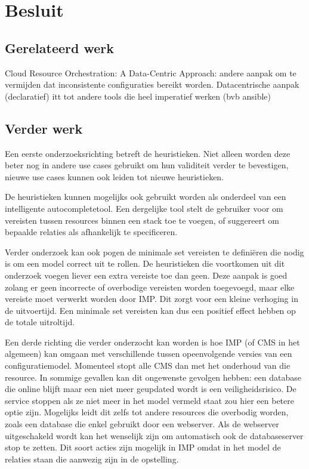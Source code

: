 \chapter{Besluit}
\label{sec:besluit}

\section{Gerelateerd werk}
Cloud Resource Orchestration: A Data-Centric Approach: andere aanpak om te vermijden dat inconsistente configuraties bereikt worden.
Datacentrische aanpak (declaratief) itt tot andere tools die heel imperatief werken (bvb ansible)


\section{Verder werk}
Een eerste onderzoeksrichting betreft de heuristieken.
Niet alleen worden deze beter nog in andere use cases gebruikt om hun validiteit verder te bevestigen, nieuwe use cases kunnen ook leiden tot nieuwe heuristieken.

De heuristieken kunnen mogelijks ook gebruikt worden als onderdeel van een intelligente autocompletetool. 
Een dergelijke tool stelt de gebruiker voor om vereisten tussen resources binnen een stack toe te voegen, of suggereert om bepaalde relaties als afhankelijk te specificeren.

Verder onderzoek kan ook pogen de minimale set vereisten te defini\"eren die nodig is om een model correct uit te rollen.
De heuristieken die voortkomen uit dit onderzoek voegen liever een extra vereiste toe dan geen.
Deze aanpak is goed zolang er geen incorrecte of overbodige vereisten worden toegevoegd, maar elke vereiste moet verwerkt worden door IMP.
Dit zorgt voor een kleine verhoging in de uitvoertijd.
Een minimale set vereisten kan dus een positief effect hebben op de totale uitroltijd.

Een derde richting die verder onderzocht kan worden is hoe IMP (of CMS in het algemeen) kan omgaan met verschillende tussen opeenvolgende versies van een configuratiemodel.
Momenteel stopt alle CMS dan met het onderhoud van die resource. 
In sommige gevallen kan dit ongewenste gevolgen hebben: een database die online blijft maar een niet meer geupdated wordt is een veiligheidsrisico.
De service stoppen als ze niet meer in het model vermeld staat zou hier een betere optie zijn.
Mogelijks leidt dit zelfs tot andere resources die overbodig worden, zoals een database die enkel gebruikt door een webserver.
Als de webserver uitgeschakeld wordt kan het wenselijk zijn om automatisch ook de databaseserver stop te zetten.
Dit soort acties zijn mogelijk in IMP omdat in het model de relaties staan die aanwezig zijn in de opstelling.
